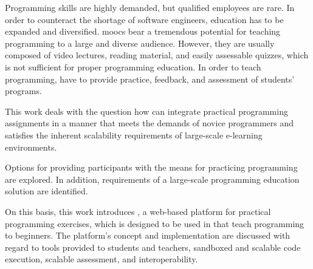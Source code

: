 Programming skills are highly demanded, but qualified employees are rare. In order to counteract the shortage of software engineers, \cs education has to be expanded and diversified. \Glspl{mooc} bear a tremendous potential for teaching programming to a large and diverse audience. However, they are usually composed of video lectures, reading material, and easily assessable quizzes, which is not sufficient for proper programming education. In order to teach programming, \moocs have to provide practice, feedback, and assessment of students' programs.

This work deals with the question how \moocs can integrate practical programming assignments in a manner that meets the demands of novice programmers and satisfies the inherent scalability requirements of large-scale e-learning environments.

Options for providing \mooc participants with the means for practicing programming are explored. In addition, requirements of a large-scale programming education solution are identified.

On this basis, this work introduces \tool, a web-based platform for practical programming exercises, which is designed to be used in \moocs that teach programming to beginners. The platform's concept and implementation are discussed with regard to tools provided to students and teachers, sandboxed and scalable code execution, scalable assessment, and interoperability.
